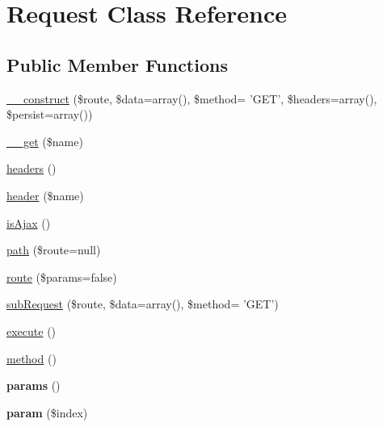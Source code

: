 \hypertarget{classRequest}{
\section{Request Class Reference}
\label{classRequest}
}
\subsection*{Public Member Functions}
\begin{DoxyCompactItemize}
\item 
\hyperlink{classRequest_af7216dd02f55fac9786612a098c6195e}{\_\-\_\-construct} (\$route, \$data=array(), \$method= 'GET', \$headers=array(), \$persist=array())
\item 
\hyperlink{classRequest_ad14cb0c1c2913fc4d86a19bfd4383dbc}{\_\-\_\-get} (\$name)
\item 
\hyperlink{classRequest_a30b1590321b7e93b6894e0ec557e46d5}{headers} ()
\item 
\hyperlink{classRequest_ac7de8477459542e9ff545cd292b7914e}{header} (\$name)
\item 
\hyperlink{classRequest_a5057f0fabb69a4c19af6e218b7b9bb7d}{isAjax} ()
\item 
\hyperlink{classRequest_aa97ca0a4c1ab78c7595a82fc8b2ec57f}{path} (\$route=null)
\item 
\hyperlink{classRequest_aeaba1ad044124a11cd68866603ce1fef}{route} (\$params=false)
\item 
\hyperlink{classRequest_a18ea75feddb5285b8097a52c78f17b2d}{subRequest} (\$route, \$data=array(), \$method= 'GET')
\item 
\hyperlink{classRequest_a7eafeed4dd7521aa654f70663d663dcf}{execute} ()
\item 
\hyperlink{classRequest_aac8d4b96b9b900a7edf41ca657ea0b6d}{method} ()
\item 
\hypertarget{classRequest_a67c4deda799d1c1d4839ed4f7830fa55}{
{\bfseries params} ()}
\label{classRequest_a67c4deda799d1c1d4839ed4f7830fa55}

\item 
\hypertarget{classRequest_aed471cd8166445eed2e6799f90499756}{
{\bfseries param} (\$index)}
\label{classRequest_aed471cd8166445eed2e6799f90499756}


\end{DoxyCompactItemize}
